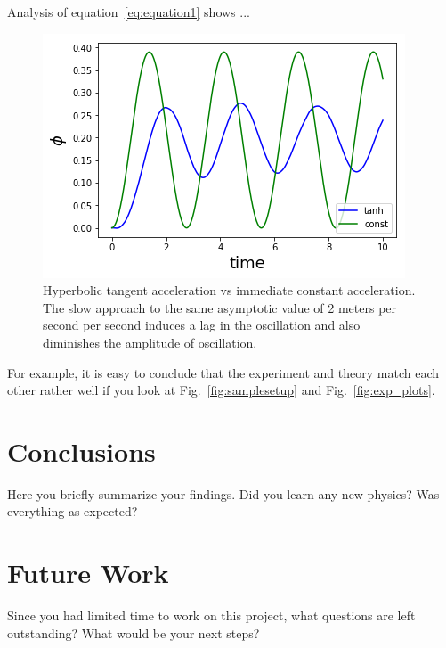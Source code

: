 \documentclass[letterpaper,12pt]{article}
\begin{document}
Analysis of equation~\ref{eq:equation1} shows ...

\blindtext

\begin{figure}
    \centering
    \includegraphics[width=.7\textwidth]{tanh_vs_const_1.png}
    \caption{Hyperbolic tangent acceleration vs immediate constant acceleration. The slow approach to the same asymptotic value of 2 meters per second per second induces a lag in the oscillation and also diminishes the amplitude of oscillation.}
\end{figure}

For example, it is easy to conclude that the
experiment and theory match each other rather well if you look at
Fig.~\ref{fig:samplesetup} and Fig.~\ref{fig:exp_plots}.


\section{Conclusions}
Here you briefly summarize your findings. Did you learn any new physics? Was everything as expected?

\section{Future Work}
Since you had limited time to work on this project, what questions are left outstanding? What would be your next steps? 




\end{document}
